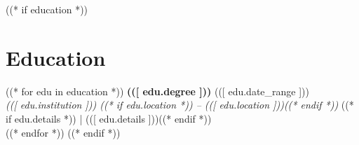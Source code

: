 \documentclass[10pt,letterpaper]{article}
\begin{document}
((* if education *))
\section{Education}
((* for edu in education *))
\textbf{(([ edu.degree ]))} \hfill (([ edu.date_range ])) \\
\textit{(([ edu.institution ])) ((* if edu.location *)) -- (([ edu.location ]))((* endif *))} ((* if edu.details *)) | (([ edu.details ]))((* endif *)) \\
((* endfor *))
((* endif *))
\end{document}
